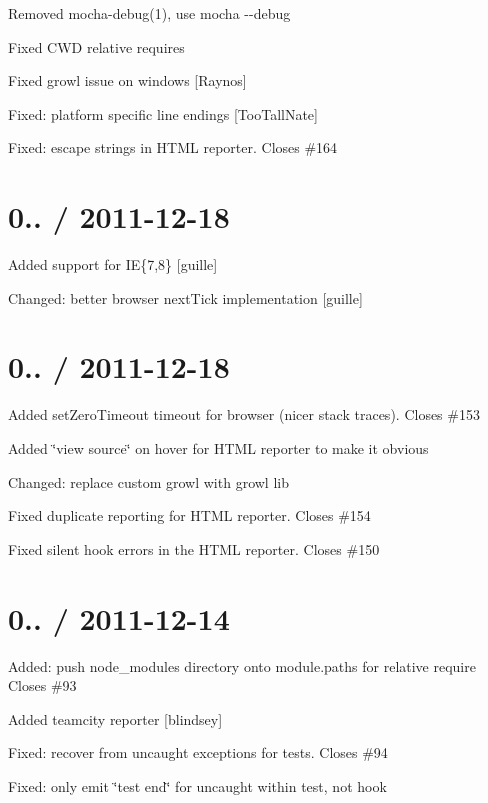 \begin{DoxyItemize}
\item Removed {\ttfamily mocha-\/debug(1)}, use {\ttfamily mocha -\/-\/debug}
\item Fixed C\+WD relative requires
\item Fixed growl issue on windows \mbox{[}Raynos\mbox{]}
\item Fixed\+: platform specific line endings \mbox{[}Too\+Tall\+Nate\mbox{]}
\item Fixed\+: escape strings in H\+T\+ML reporter. Closes \#164
\end{DoxyItemize}

\section*{0.. / 2011-\/12-\/18}


\begin{DoxyItemize}
\item Added support for IE\{7,8\} \mbox{[}guille\mbox{]}
\item Changed\+: better browser next\+Tick implementation \mbox{[}guille\mbox{]}
\end{DoxyItemize}

\section*{0.. / 2011-\/12-\/18}


\begin{DoxyItemize}
\item Added set\+Zero\+Timeout timeout for browser (nicer stack traces). Closes \#153
\item Added \char`\"{}view source\char`\"{} on hover for H\+T\+ML reporter to make it obvious
\item Changed\+: replace custom growl with growl lib
\item Fixed duplicate reporting for H\+T\+ML reporter. Closes \#154
\item Fixed silent hook errors in the H\+T\+ML reporter. Closes \#150
\end{DoxyItemize}

\section*{0.. / 2011-\/12-\/14}


\begin{DoxyItemize}
\item Added\+: push node\+\_\+modules directory onto module.\+paths for relative require Closes \#93
\item Added teamcity reporter \mbox{[}blindsey\mbox{]}
\item Fixed\+: recover from uncaught exceptions for tests. Closes \#94
\item Fixed\+: only emit \char`\"{}test end\char`\"{} for uncaught within test, not hook
\end{DoxyItemize}


